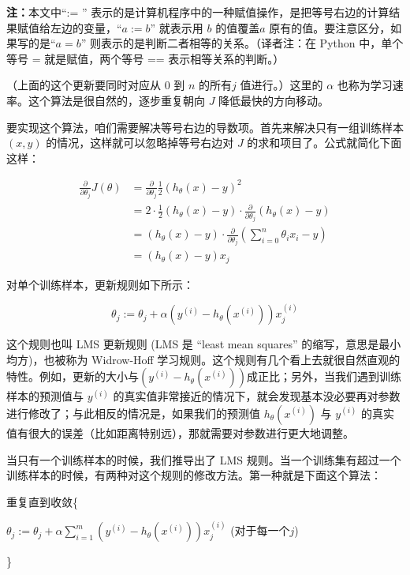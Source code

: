 \documentclass[UTF8]{ctexart}
\begin{document}
		\textbf{注：}本文中“:= ” 表示的是计算机程序中的一种赋值操作，是把等号右边的计算结果赋值给左边的变量，“$ a := b $” 就表示用 $ b $ 的值覆盖$ a $ 原有的值。要注意区分，如果写的是“$ a = b $” 则表示的是判断二者相等的关系。（译者注：在 Python 中，单个等号 = 就是赋值，两个等号 ==  表示相等关系的判断。） 
		
		（上面的这个更新要同时对应从 $0$ 到 $ n $ 的所有$ j $ 值进行。）这里的 $ \alpha$ 也称为学习速率。这个算法是很自然的，逐步重复朝向 $ J $ 降低最快的方向移动。
		
		要实现这个算法，咱们需要解决等号右边的导数项。首先来解决只有一组训练样本 $ (x, y) $ 的情况，这样就可以忽略掉等号右边对 $ J $ 的求和项目了。公式就简化下面这样：
		
		\begin{align*}
			 \frac{\partial}{\partial\theta_{j}}J(\theta)  &=  \frac{\partial}{\partial\theta_{j}} \frac{1}{2}(h_{\theta}(x)-y)^2 \\
			   &= 2 \cdot \frac{1}{2}(h_{\theta}(x)-y) \cdot  \frac{\partial}{\partial\theta_{j}}(h_{\theta}(x)-y) \\
			   &= (h_{\theta}(x)-y) \cdot \frac{\partial}{\partial\theta_{j}}( \sum_{i=0}^{n}\theta_{i}x_{i} - y) \\
			   &= (h_{\theta}(x)-y) x_{j}
		\end{align*}
		
		对单个训练样本，更新规则如下所示：
		
		\[ \theta_{j} := \theta_{j} + \alpha(y^{(i)} - h_{\theta}(x^{(i)}))x_{j}^{(i)} \]
		
		
		这个规则也叫 LMS 更新规则 (LMS 是 “least mean squares” 的缩写，意思是最小均方)，也被称为 Widrow-Hoff 学习规则。这个规则有几个看上去就很自然直观的特性。例如，更新的大小与$ (y^{(i)} - h_{\theta}(x^{(i)})) $成正比；另外，当我们遇到训练样本的预测值与 $ y^{(i)} $ 的真实值非常接近的情况下，就会发现基本没必要再对参数进行修改了；与此相反的情况是，如果我们的预测值 $ h_{\theta}(x^{(i)}) $ 与 $ y^{(i)} $ 的真实值有很大的误差（比如距离特别远），那就需要对参数进行更大地调整。
		
		
		当只有一个训练样本的时候，我们推导出了 LMS 规则。当一个训练集有超过一个训练样本的时候，有两种对这个规则的修改方法。第一种就是下面这个算法：
		
		\par 重复直到收敛\{ 
			\begin{center}
				$ \theta_{j} := \theta_{j} + \alpha \sum_{i=1}^{m} (y^{(i)} - h_{\theta}(x^{(i)}))x_{j}^{(i)}$
				(对于每一个$j$)
			\end{center}
		\par\}
		
\end{document}
